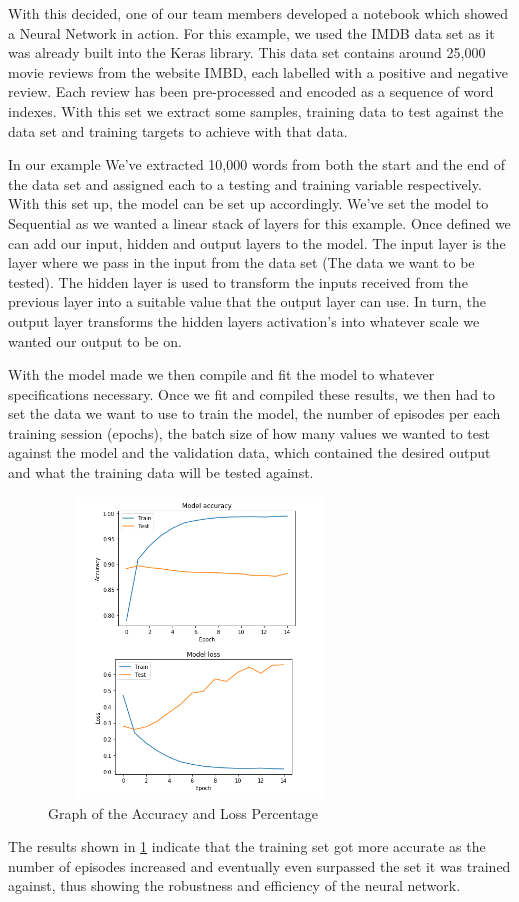 \begin{itemize}
With this decided, one of our team members developed a notebook which showed a Neural Network in action. For this example, we used the IMDB data set as it was already built into the Keras library. This data set contains around 25,000 movie reviews from the website IMBD, each labelled with a positive and negative review. Each review has been pre-processed and encoded as a sequence of word indexes. With this set we extract some samples, training data to test against the data set and training targets to achieve with that data. 

In our example We’ve extracted 10,000 words from both the start and the end of the data set and assigned each to a testing and training variable respectively. With this set up, the model can be set up accordingly. We’ve set the model to Sequential as we wanted a linear stack of layers for this example. Once defined we can add our input, hidden and output layers to the model. The input layer is the layer where we pass in the input from the data set (The data we want to be tested). The hidden layer is used to transform the inputs received from the previous layer into a suitable value that the output layer can use. In turn, the output layer transforms the hidden layers activation's into whatever scale we wanted our output to be on. 

With the model made we then compile and fit the model to whatever specifications necessary. Once we fit and compiled these results, we then had to set the data we want to use to train the model, the number of episodes per each training session (epochs), the batch size of how many values we wanted to test against the model and the validation data, which contained the desired output and what the training data will be tested against.
\begin{figure}[H]
    \centering
    \includegraphics[width=80mm, height=80mm]{img/IMBD_results.PNG}
    \caption{Graph of the Accuracy and Loss Percentage}
    \label{fig:graph-results}
\end{figure}
The results shown in \ref{fig:graph-results} indicate that the training set got more accurate as the number of episodes increased and eventually even surpassed the set it was trained against, thus showing the robustness and efficiency of the neural network.


\end{itemize}
